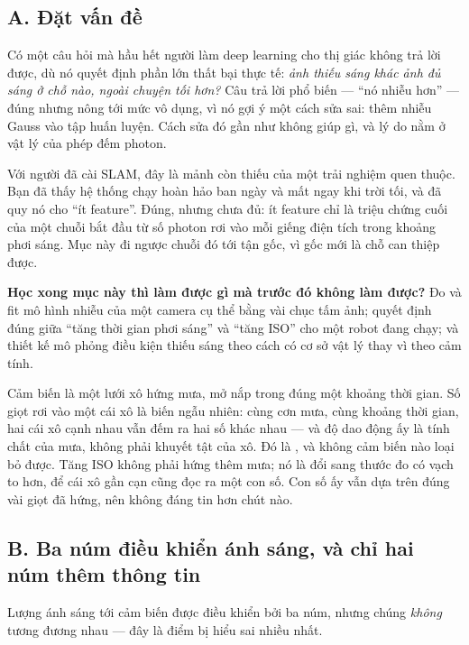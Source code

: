 \documentclass[../../../deep_learning.tex]{subfiles}
\begin{document}
\subsection{A. Đặt vấn đề}
Có một câu hỏi mà hầu hết người làm deep learning cho thị giác không trả lời được, dù nó quyết định phần lớn thất bại thực tế: \emph{ảnh thiếu sáng khác ảnh đủ sáng ở chỗ nào, ngoài chuyện tối hơn?} Câu trả lời phổ biến --- ``nó nhiễu hơn'' --- đúng nhưng nông tới mức vô dụng, vì nó gợi ý một cách sửa sai: thêm nhiễu Gauss vào tập huấn luyện. Cách sửa đó gần như không giúp gì, và lý do nằm ở vật lý của phép đếm photon.

Với người đã cài SLAM, đây là mảnh còn thiếu của một trải nghiệm quen thuộc. Bạn đã thấy hệ thống chạy hoàn hảo ban ngày và mất  ngay khi trời tối, và đã quy nó cho ``ít feature''. Đúng, nhưng chưa đủ: ít feature chỉ là triệu chứng cuối của một chuỗi bắt đầu từ số photon rơi vào mỗi giếng điện tích trong khoảng phơi sáng. Mục này đi ngược chuỗi đó tới tận gốc, vì gốc mới là chỗ can thiệp được.

\textbf{Học xong mục này thì làm được gì mà trước đó không làm được?} Đo và fit mô hình nhiễu của một camera cụ thể bằng vài chục tấm ảnh; quyết định đúng giữa ``tăng thời gian phơi sáng'' và ``tăng ISO'' cho một robot đang chạy; và thiết kế  mô phỏng điều kiện thiếu sáng theo cách có cơ sở vật lý thay vì theo cảm tính.

\begin{trucgiac}
Cảm biến là một lưới xô hứng mưa, mở nắp trong đúng một khoảng thời gian. Số giọt rơi vào một cái xô là biến ngẫu nhiên: cùng cơn mưa, cùng khoảng thời gian, hai cái xô cạnh nhau vẫn đếm ra hai số khác nhau --- và độ dao động ấy là tính chất của mưa, không phải khuyết tật của xô. Đó là , và không cảm biến nào loại bỏ được. Tăng ISO không phải hứng thêm mưa; nó là đổi sang thước đo có vạch to hơn, để cái xô gần cạn cũng đọc ra một con số. Con số ấy vẫn dựa trên đúng vài giọt đã hứng, nên không đáng tin hơn chút nào.
\end{trucgiac}

\subsection{B. Ba núm điều khiển ánh sáng, và chỉ hai núm thêm thông tin}
Lượng ánh sáng tới cảm biến được điều khiển bởi ba núm, nhưng chúng \emph{không} tương đương nhau --- đây là điểm bị hiểu sai nhiều nhất.
\end{document}
